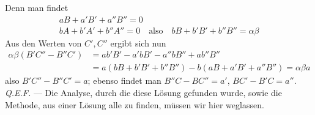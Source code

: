 Denn man findet
\[
\begin{gathered}
aB+a'B'+a''B''=0\\
bA+b'A'+b''A''=0\quad\text{also}\quad bB+b'B'+b''B''=\alpha\beta
\end{gathered}
\]
Aus den Werten von $C',C''$ ergibt sich nun
\[
\begin{aligned}
\alpha\beta(B'C''-B''C')
&=ab'B'-a'bB'-a''bB''+ab''B''\\
&=a(bB+b'B'+b''B'')-b(aB+a'B'+a''B'')=\alpha\beta a
\end{aligned}
\]
also $B'C''-B''C'=a$; ebenso findet man $B''C-BC''=a'$, $BC'-B'C=a''$. \textit{Q.E.F.} --- Die Analyse, durch die diese Lösung gefunden wurde, sowie die Methode, aus einer Lösung alle zu finden, müssen wir hier weglassen.
